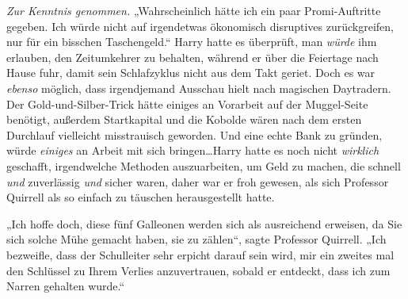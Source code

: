 \emph{Zur Kenntnis genommen.} „Wahrscheinlich hätte ich ein paar Promi-Auftritte gegeben. Ich würde nicht auf irgendetwas ökonomisch disruptives zurückgreifen, nur für ein bisschen Taschengeld.“ Harry hatte es überprüft, man \emph{würde} ihm erlauben, den Zeitumkehrer zu behalten, während er über die Feiertage nach Hause fuhr, damit sein Schlafzyklus nicht aus dem Takt geriet. Doch es war \emph{ebenso} möglich, dass irgendjemand Ausschau hielt nach magischen Daytradern.%
Der Gold-und-Silber-Trick hätte einiges an Vorarbeit auf der Muggel-Seite benötigt, außerdem Startkapital und die Kobolde wären nach dem ersten Durchlauf vielleicht misstrauisch geworden. Und eine echte Bank zu gründen, würde \emph{einiges} an Arbeit mit sich bringen…Harry hatte es noch nicht \emph{wirklich} geschafft, irgendwelche Methoden auszuarbeiten, um Geld zu machen, die schnell \emph{und} zuverlässig \emph{und} sicher waren, daher war er froh gewesen, als sich Professor Quirrell als so einfach zu täuschen herausgestellt hatte.

„Ich hoffe doch, diese fünf Galleonen werden sich als ausreichend erweisen, da Sie sich solche Mühe gemacht haben, sie zu zählen“, sagte Professor Quirrell. „Ich bezweifle, dass der Schulleiter sehr erpicht darauf sein wird, mir ein zweites mal den Schlüssel zu Ihrem Verlies anzuvertrauen, sobald er entdeckt, dass ich zum Narren gehalten wurde.“

